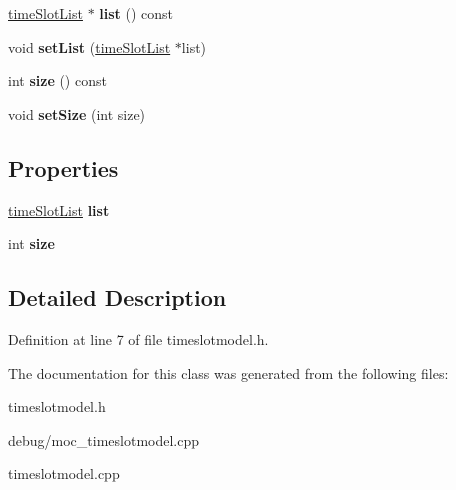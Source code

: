 \begin{DoxyCompactItemize}
\mbox{\label{classtime_slot_model_a545f2f51bc855c04e4f47964fc79ca19}} 
\mbox{\hyperlink{classtime_slot_list}{time\+Slot\+List}} $\ast$ {\bfseries list} () const
\item 
\mbox{\label{classtime_slot_model_a59aa5f346460a6aaef9b2b196e61cedc}} 
void {\bfseries set\+List} (\mbox{\hyperlink{classtime_slot_list}{time\+Slot\+List}} $\ast$list)
\item 
\mbox{\label{classtime_slot_model_a974ad7212eee6066625c7ad37f628210}} 
int {\bfseries size} () const
\item 
\mbox{\label{classtime_slot_model_a826b092b7df775286882ba7f9cee82db}} 
void {\bfseries set\+Size} (int size)
\end{DoxyCompactItemize}
\subsection*{Properties}
\begin{DoxyCompactItemize}
\item 
\mbox{\label{classtime_slot_model_a330c04e7bfd74add76d8d3dbf7da6e30}} 
\mbox{\hyperlink{classtime_slot_list}{time\+Slot\+List}} {\bfseries list}
\item 
\mbox{\label{classtime_slot_model_a04b118aa0a283bc1441eb1d3da649438}} 
int {\bfseries size}
\end{DoxyCompactItemize}


\subsection{Detailed Description}


Definition at line 7 of file timeslotmodel.\+h.



The documentation for this class was generated from the following files\+:\begin{DoxyCompactItemize}
\item 
timeslotmodel.\+h\item 
debug/moc\+\_\+timeslotmodel.\+cpp\item 
timeslotmodel.\+cpp\end{DoxyCompactItemize}
